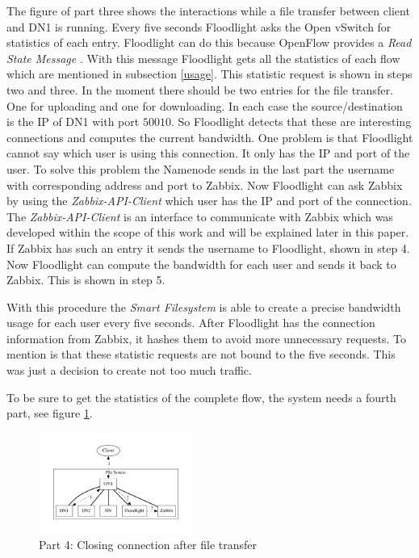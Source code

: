 The figure of part three shows the interactions while a file transfer between client and DN1 is running. Every five seconds Floodlight asks the Open vSwitch for statistics of each entry. Floodlight can do this because OpenFlow provides a \textit{Read State Message} \cite[p. 30]{ofspec}. With this message Floodlight gets all the statistics of each flow which are mentioned in subsection \ref{usage}. This statistic request is shown in steps two and three. In the moment there should be two entries for the file transfer. One for uploading and one for downloading. In each case the source/destination is the IP of DN1 with port $50010$. So Floodlight detects that these are interesting connections and computes the current bandwidth. One problem is that Floodlight cannot say which user is using this connection. It only has the IP and port of the user. To solve this problem the Namenode sends in the last part the username with corresponding address and port to Zabbix. Now Floodlight can ask Zabbix by using the \textit{Zabbix-API-Client} which user has the IP and port of the connection. The \textit{Zabbix-API-Client} is an interface to communicate with Zabbix which was developed within the scope of this work and will be explained later in this paper. If Zabbix has such an entry it sends the username to Floodlight, shown in step 4. Now Floodlight can compute the bandwidth for each user and sends it back to Zabbix. This is shown in step 5.

With this procedure the \textit{Smart Filesystem} is able to create a precise bandwidth usage for each user every five seconds. After Floodlight has the connection information from Zabbix, it hashes them to avoid more unnecessary requests. To mention is that these statistic requests are not bound to the five seconds. This was just a decision to create not too much traffic.

To be sure to get the statistics of the complete flow, the system needs a fourth part, see figure \ref{cc}.  

\begin{figure}[htp]
\centering
\includegraphics[width=0.45\textwidth]{img/closeConnection} 
\caption{Part 4: Closing connection after file transfer}
\label{cc}
\end{figure}

